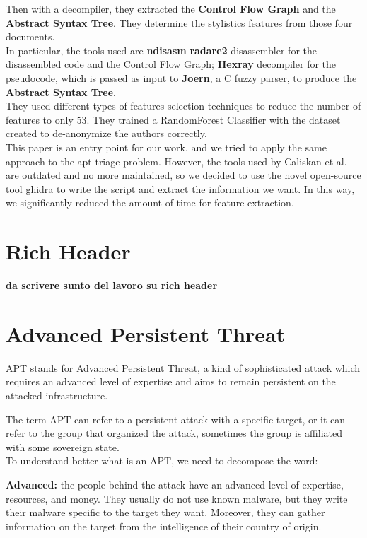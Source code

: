 Then with a decompiler, they extracted the \textbf{Control Flow Graph} and the \textbf{Abstract Syntax Tree}. They determine the stylistics features from those four documents.
\\
In particular, the tools used are \textbf{ndisasm} \textbf{radare2} disassembler for the disassembled code and the Control Flow Graph; \textbf{Hexray} decompiler for the pseudocode, which is passed as input to \textbf{Joern}, a C fuzzy parser, to produce the  \textbf{Abstract Syntax Tree}.\\

They used different types of features selection techniques to reduce the number of features to only 53. They trained a RandomForest Classifier with the dataset created to de-anonymize the authors correctly. \\

This paper is an entry point for our work, and we tried to apply the same approach to the apt triage problem. However, the tools used by Caliskan et al. are outdated and no more maintained, so we decided to use the novel open-source tool ghidra to write the script and extract the information we want. In this way, we significantly reduced the amount of time for feature extraction.



\section{Rich Header}
\textbf{da scrivere sunto del lavoro su rich header}
\cite{dubyk2019sans}

\section{Advanced Persistent Threat}

APT stands for Advanced Persistent Threat, a kind of sophisticated attack which requires an advanced level of expertise and aims to remain persistent on the attacked infrastructure.

The term APT can refer to a persistent attack with a specific target, or it can refer to the group that organized the attack, sometimes the group is affiliated with some sovereign state.
\\

To understand better what is an APT, we need to decompose the word: 

\textbf{Advanced:} the people behind the attack have an advanced level of expertise, resources, and money. They usually do not use known malware, but they write their malware specific to the target they want. Moreover, they can gather information on the target from the intelligence of their country of origin.

